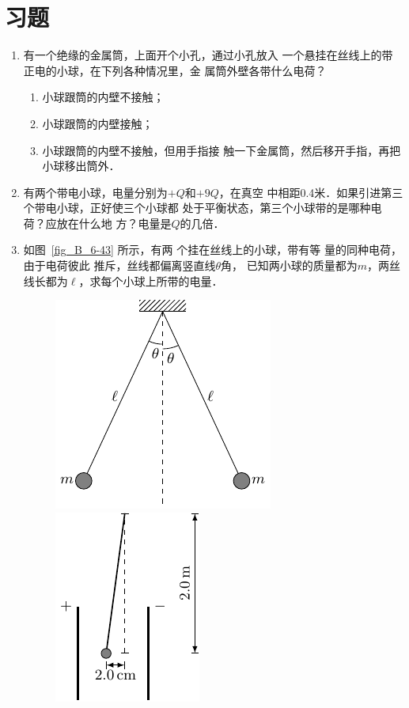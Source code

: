 \section*{习题}
\begin{enumerate}
\item 有一个绝缘的金属筒，上面开个小孔，通过小孔放入
一个悬挂在丝线上的带正电的小球，在下列各种情况里，金
属筒外壁各带什么电荷？
\begin{enumerate}
\item 小球跟筒的内壁不接触；
\item 小球跟筒的内壁接触；
\item 小球跟筒的内壁不接触，但用手指接
触一下金属筒，然后移开手指，再把小球移出筒外．
\end{enumerate}

\item 有两个带电小球，电量分别为$+Q$和$+9Q$，在真空
中相距0.4米．如果引进第三个带电小球，正好使三个小球都
处于平衡状态，第三个小球带的是哪种电荷？应放在什么地
方？电量是$Q$的几倍．
\item 如图~\ref{fig_B_6-43} 所示，有两
个挂在丝线上的小球，带有等
量的同种电荷，由于电荷彼此
推斥，丝线都偏离竖直线$\theta$角，
已知两小球的质量都为$m$，两丝线长都为$\ell$，求每个小球上所带的电量．

\begin{figure}[htbp]
    \centering
    \begin{minipage}[t]{0.48\textwidth}
        \centering
        \includegraphics{fig/B/6-43.pdf}
        \caption{}\label{fig_B_6-43}
    \end{minipage}
    \begin{minipage}[t]{0.48\textwidth}
        \centering
        \includegraphics{fig/B/6-44.pdf}
        \caption{}\label{fig_B_6-44}
    \end{minipage}
\end{figure}




\end{enumerate}

